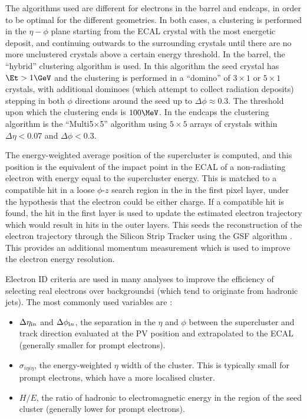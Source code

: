 The algorithms used are different for electrons in the barrel and endcaps, in
order to be optimal for the different geometries. In both cases, a clustering is performed
in the $\eta-\phi$ plane starting from the \ac{ECAL} crystal with the most energetic deposit, and
continuing outwards to the surrounding crystals until there are no more
unclustered crystals above a certain energy threshold. In the barrel, the
``hybrid'' clustering algorithm is used. In this algorithm the seed crystal has
$\Et > 1 \GeV$ and the clustering is performed in a ``domino'' of $3\times1$ or
$5\times1$ crystals, with additional dominoes (which attempt to collect
radiation deposits) stepping in both $\phi$
directions around the seed up to $\Delta\phi\approx0.3$. The threshold upon
which the clustering ends is $100\MeV$. In the endcaps the clustering algorithm
is the ``Multi5$\times$5'' algorithm using $5\times5$ arrays of crystals within
$\Delta\eta<0.07$ and $\Delta\phi<0.3$.

The energy-weighted average position of the supercluster is computed, and this
position is the equivalent of the impact point in the \ac{ECAL} of a
non-radiating electron with energy equal to the supercluster energy. This is
matched to a compatible hit in a loose $\phi$-$z$ search region 
in the in the first pixel layer, under the
hypothesis that the electron could be either charge. If a compatible hit is
found, the hit in the first layer is used to update the estimated electron
trajectory which would result in hits in the outer layers. This seeds the
reconstruction of the electron trajectory through the Silicon Strip Tracker
using the \ac{GSF} algorithm \cite{GSFalgorithm}. This provides an additional momentum measurement
which is used to improve the electron energy resolution. 

Electron ID criteria are used in many analyses to improve the efficiency of
selecting real electrons over backgroundsi (which tend to originate from
hadronic jets). The most commonly used variables are \cite{Baffioni:2006cd}:

\begin{itemize}
\item $\Delta\eta_{\text in}$ and $\Delta\phi_{\text in}$, the separation in the
$\eta$ and $\phi$ between the supercluster and track direction
evaluated at the \ac{PV} position and extrapolated to the \ac{ECAL} (generally
smaller for prompt electrons).
\item $\sigma_{i\eta i\eta}$, the energy-weighted $\eta$ width of the cluster.
This is typically small for prompt electrons, which have a more localised
cluster.
\item $H/E$, the ratio of hadronic to electromagnetic energy in the region of
the seed cluster (generally lower for prompt electrons).
\end{itemize}

